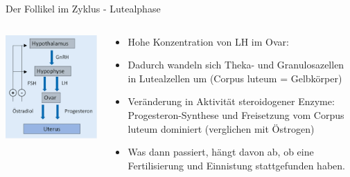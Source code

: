 \documentclass{beamer}
\begin{document}
\begin{frame}{Der Follikel im Zyklus - Lutealphase}
    
    
    \begin{columns}[c]

\begin{column}{4cm}

\begin{center}
\includegraphics[width=\textwidth]{hypothalamus_hypophyse_ovar.png}
\end{center}

\end{column}

\begin{column}{7cm}
\begin{itemize}
    \item 
Hohe  Konzentration von LH im Ovar:
    \item 
Dadurch wandeln sich Theka- und Granulosazellen in Lutealzellen um (Corpus luteum = Gelbkörper)
\item
Veränderung in Aktivität steroidogener Enzyme: Progesteron-Synthese und Freisetzung vom Corpus luteum dominiert (verglichen mit Östrogen)

\pause
\item
Was dann passiert, hängt davon ab, ob eine Fertilisierung und Einnistung stattgefunden haben. 
\end{itemize}

\end{column}
\end{columns}


\end{frame}
\end{document}
